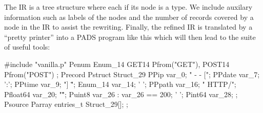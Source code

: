 \documentclass{article}
\begin{document}
The IR is a tree structure where each if its node is a type.
We include auxilary information such as labels of the nodes
and the number of records covered by a node in the IR to assist
the rewriting. Finally, the refined IR is translated
by a ``pretty printer'' into a PADS program like this which will
then lead to the suite of useful tools:

{\small
\begin{code}
#include "vanilla.p"
Penum Enum_14 {
        GET14 Pfrom("GET"),
        POST14 Pfrom("POST")
};
Precord Pstruct Struct_29 {
        PPip var_0;
        " - - [";
        PPdate var_7;
        ':';
        PPtime var_9;
        "] \"";
        Enum_14 var_14;
        ' ';
        PPpath var_16;
        " HTTP/";
        Pfloat64 var_20;
        "\" ";
        Puint8 var_26 : var_26 == 200;
        ' ';
        Pint64 var_28;
};
Psource Parray entries_t {
        Struct_29[];
};
\end{code}
}



\end{document}
